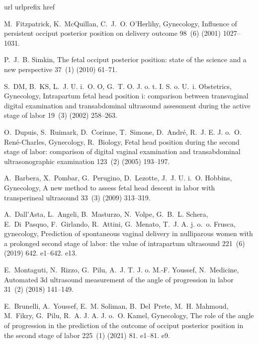 \documentclass[preprint,12pt]{elsarticle}
\begin{document}
 
% 
\begin{thebibliography}{10}
\expandafter\ifx\csname url\endcsname\relax
  \def\url#1{\texttt{#1}}\fi
\expandafter\ifx\csname urlprefix\endcsname\relax\def\urlprefix{URL }\fi
\expandafter\ifx\csname href\endcsname\relax
  \def\href#1#2{#2} \def\path#1{#1}\fi
  
M.~Fitzpatrick, K.~McQuillan, C.~J.~O. O’Herlihy, Gynecology, Influence of persistent occiput posterior position on delivery outcome 98~(6) (2001) 1027--1031.

P.~J.~B. Simkin, The fetal occiput posterior position: state of the science and a new perspective 37~(1) (2010) 61--71.

S.~DM, B.~KS, L.~J. U. i.~O. O, G.~T. O. J. o. t. I. S. o. U.~i. Obstetrics, Gynecology, Intrapartum fetal head position i: comparison between transvaginal digital examination and transabdominal ultrasound assessment during the active stage of labor 19~(3) (2002) 258--263.

O.~Dupuis, S.~Ruimark, D.~Corinne, T.~Simone, D.~André, R.~J. E. J. o.~O. René-Charles, Gynecology, R.~Biology, Fetal head position during the second stage of labor: comparison of digital vaginal examination and transabdominal ultrasonographic examination 123~(2) (2005) 193--197.


A.~Barbera, X.~Pombar, G.~Perugino, D.~Lezotte, J.~J. U. i.~O. Hobbins, Gynecology, A new method to assess fetal head descent in labor with transperineal ultrasound 33~(3) (2009) 313--319.

A.~Dall’Asta, L.~Angeli, B.~Masturzo, N.~Volpe, G.~B.~L. Schera, E.~Di~Pasquo, F.~Girlando, R.~Attini, G.~Menato, T.~J. A. j. o.~o. Frusca, gynecology, Prediction of spontaneous vaginal delivery in nulliparous women with a prolonged second stage of labor: the value of intrapartum ultrasound 221~(6) (2019) 642. e1--642. e13.

E.~Montaguti, N.~Rizzo, G.~Pilu, A.~J. T. J. o. M.-F. Youssef, N.~Medicine, Automated 3d ultrasound measurement of the angle of progression in labor 31~(2) (2018) 141--149.

E.~Brunelli, A.~Youssef, E.~M. Soliman, B.~Del~Prete, M.~H. Mahmoud, M.~Fikry, G.~Pilu, R.~A. J. A. J. o.~O. Kamel, Gynecology, The role of the angle of progression in the prediction of the outcome of occiput posterior position in the second stage of labor 225~(1) (2021) 81. e1--81. e9.


\end{thebibliography}
\end{document}
